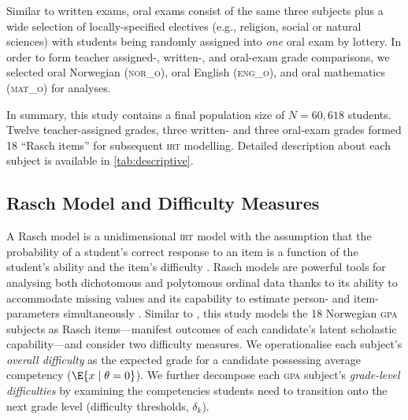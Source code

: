 Similar to written exams, oral exams consist of the same three subjects plus a wide selection of locally-specified electives (e.g., religion, social or natural sciences) with students being randomly assigned into \emph{one} oral exam by lottery. In order to form teacher assigned-, written-, and oral-exam grade comparisons, we selected oral Norwegian (\textsc{nor\_o}), oral English (\textsc{eng\_o}), and oral mathematics (\textsc{mat\_o}) for analyses.

In summary, this study contains a final population size of $N = 60,618$ students. Twelve teacher-assigned grades, three written- and three oral-exam grades formed 18 ``Rasch items'' for subsequent \textsc{irt} modelling. Detailed description about each subject is available in \cref{tab:descriptive}.

\subsection{Rasch Model and Difficulty Measures}

A Rasch model is a unidimensional \textsc{irt} model with the assumption that the probability of a student's correct response to an item is a function of the student's ability and the item's difficulty \parencite{rasch:1960}. Rasch models are powerful tools for analysing both dichotomous and polytomous ordinal data thanks to its ability to accommodate missing values and its capability to estimate person- and item-parameters simultaneously \parencite{deayala:2022}. Similar to \textcite{he:2018}, this study models the 18 Norwegian \textsc{gpa} subjects as Rasch items---manifest outcomes of each candidate's latent scholastic capability---and consider two difficulty measures. We operationalise each subject's \emph{overall difficulty} as the expected grade for a candidate possessing average competency ($\E{x \mid \theta = 0}$). We further decompose each \textsc{gpa}  subject's \emph{grade-level difficulties} by examining the competencies students need to transition onto the next grade level (difficulty thresholds, $\delta_k$).

